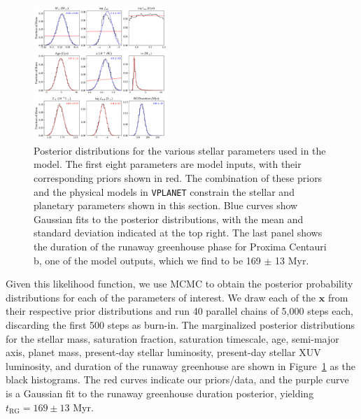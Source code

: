 \documentclass[]{emulateapj}
\begin{document}
\begin{figure}[hbt]
  \begin{center}
      \includegraphics[width=0.45\textwidth]{figures/star_posteriors.pdf}
       \caption{Posterior distributions for the various stellar parameters used in the model. The first eight
                parameters are model inputs, with their corresponding priors shown in red. The combination of
                these priors and the physical models in \texttt{VPLANET} constrain the stellar and planetary
                parameters shown in this section. Blue curves show Gaussian fits to the posterior distributions,
                with the mean and standard deviation indicated at the top right.
                The last panel shows the duration of the runaway greenhouse
                phase for Proxima Centauri b, one of the model outputs, which we find to be 169 $\pm$ 13 Myr.}
     \label{fig:star_posteriors}
  \end{center}
\end{figure}

Given this likelihood function, we use MCMC to obtain the posterior probability distributions for each of the parameters
of interest. We draw each of the $\mathbf{x}$ from their respective prior distributions and run 40 parallel chains of 5,000 
steps each, discarding the first 500 steps as burn-in. The marginalized posterior distributions for the stellar mass, saturation fraction,
saturation timescale, age, semi-major axis, planet mass, present-day stellar luminosity, present-day stellar XUV luminosity, and 
duration of the runaway greenhouse are shown in Figure~\ref{fig:star_posteriors} as the black histograms. The red curves 
indicate our priors/data, and the purple curve is a Gaussian fit to the runaway greenhouse duration posterior,
yielding $t_\mathrm{RG} = 169 \pm 13$ Myr.
\end{document}
